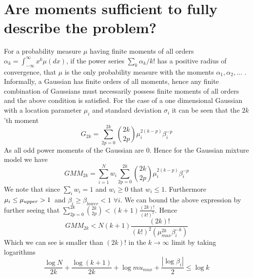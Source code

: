 \documentclass[journal]{IEEEtran}
\begin{document}
	\section{Are moments sufficient to fully describe the problem?}
	\label{momentsanddistributions}
	For a probability measure $\mu$ having finite moments of all orders $\alpha_{k} = \int_{-\infty}^{\infty} x^{k}\mu(dx)$, if the power series $\sum_{k}\alpha_{k}/k!$ has a positive radius of convergence, that $\mu$ is the only probability measure with the moments $\alpha_{1},\alpha_{2},...$ \cite{billingsley_2012}. \newline Informally, a Gaussian has finite orders of all moments, hence any finite combination of Gaussians must necessarily possess finite moments of all orders and the above condition is satisfied.
	\newline For the case of a one dimensional Gaussian with a location parameter $\mu_{i}$ and standard deviation $\sigma_{i}$ it can be seen that the $2k$'th moment
	\begin{equation}
	G_{2k} = \sum_{2p=0}^{2k} {2k\choose 2p} \mu_{i}^{2(k-p)}\beta_{i}^{-p}
	\end{equation}
	As all odd power moments of the Gaussian are 0. Hence for the Gaussian mixture model we have
	\begin{equation}
	GMM_{2k} = \sum_{i=1}^{N}w_{i}\sum_{2p=0}^{2k} {2k\choose 2p} \mu_{i}^{2(k-p)}\beta_{i}^{-p}
	\end{equation}
	We note that since $\sum_{i} w_{i} = 1$ and $w_{i}\geq 0$ that $w_{i}\leq 1$. Furthermore $\mu_{i} \leq \mu_{upper} > 1 \thinspace $ and $\beta_{i} \geq \beta_{lower} < 1$ $\forall i$. We can bound the above expression by further seeing that $\sum_{2p=0}^{2k} {2k\choose 2p} < (k+1)\frac{(2k)!}{(k!)^{2}}$. Hence
	\begin{equation}
	GMM_{2k} < N(k+1)\frac{(2k)!}{(k!)^{2}(\mu_{max}^{2k}\beta_{i}^{-k})}
	\end{equation}
	Which we can see is smaller than $(2k)!$ in the $k\rightarrow \infty$ limit by taking logarithms
	\begin{equation}
	\frac{\log N}{2k} + \frac{\log(k+1)}{2k} + \log mu_{max} + \frac{|\log \beta_{i}|}{2} \leq \log k 
	\end{equation} 
 
\end{document}
